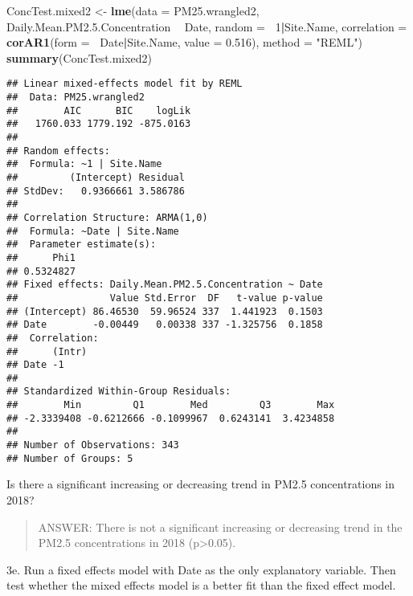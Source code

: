 \documentclass[]{article}
\newenvironment{Shaded}{\begin{snugshade}}{\end{snugshade}}
\newcommand{\KeywordTok}[1]{\textcolor[rgb]{0.13,0.29,0.53}{\textbf{#1}}}
\newcommand{\DataTypeTok}[1]{\textcolor[rgb]{0.13,0.29,0.53}{#1}}
\newcommand{\DecValTok}[1]{\textcolor[rgb]{0.00,0.00,0.81}{#1}}
\newcommand{\FloatTok}[1]{\textcolor[rgb]{0.00,0.00,0.81}{#1}}
\newcommand{\StringTok}[1]{\textcolor[rgb]{0.31,0.60,0.02}{#1}}
\newcommand{\OperatorTok}[1]{\textcolor[rgb]{0.81,0.36,0.00}{\textbf{#1}}}
\newcommand{\NormalTok}[1]{#1}
\begin{document}
\begin{Shaded}
\begin{Highlighting}[]
\NormalTok{ConcTest.mixed2 <-}\StringTok{ }\KeywordTok{lme}\NormalTok{(}\DataTypeTok{data =}\NormalTok{ PM25.wrangled2,}
\NormalTok{                     Daily.Mean.PM2.}\FloatTok{5.}\NormalTok{Concentration }\OperatorTok{~}\StringTok{ }\NormalTok{Date,}
                     \DataTypeTok{random =} \OperatorTok{~}\DecValTok{1}\OperatorTok{|}\NormalTok{Site.Name,}
                     \DataTypeTok{correlation =} \KeywordTok{corAR1}\NormalTok{(}\DataTypeTok{form =} \OperatorTok{~}\NormalTok{Date}\OperatorTok{|}\NormalTok{Site.Name, }\DataTypeTok{value =} \FloatTok{0.516}\NormalTok{),}
                     \DataTypeTok{method =} \StringTok{"REML"}\NormalTok{)}
\KeywordTok{summary}\NormalTok{(ConcTest.mixed2)}
\end{Highlighting}
\end{Shaded}

\begin{verbatim}
## Linear mixed-effects model fit by REML
##  Data: PM25.wrangled2 
##        AIC      BIC    logLik
##   1760.033 1779.192 -875.0163
## 
## Random effects:
##  Formula: ~1 | Site.Name
##         (Intercept) Residual
## StdDev:   0.9366661 3.586786
## 
## Correlation Structure: ARMA(1,0)
##  Formula: ~Date | Site.Name 
##  Parameter estimate(s):
##      Phi1 
## 0.5324827 
## Fixed effects: Daily.Mean.PM2.5.Concentration ~ Date 
##                Value Std.Error  DF   t-value p-value
## (Intercept) 86.46530  59.96524 337  1.441923  0.1503
## Date        -0.00449   0.00338 337 -1.325756  0.1858
##  Correlation: 
##      (Intr)
## Date -1    
## 
## Standardized Within-Group Residuals:
##        Min         Q1        Med         Q3        Max 
## -2.3339408 -0.6212666 -0.1099967  0.6243141  3.4234858 
## 
## Number of Observations: 343
## Number of Groups: 5
\end{verbatim}

Is there a significant increasing or decreasing trend in PM2.5
concentrations in 2018?

\begin{quote}
ANSWER: There is not a significant increasing or decreasing trend in the
PM2.5 concentrations in 2018 (p\textgreater{}0.05).
\end{quote}

3e. Run a fixed effects model with Date as the only explanatory
variable. Then test whether the mixed effects model is a better fit than
the fixed effect model.
\end{document}
